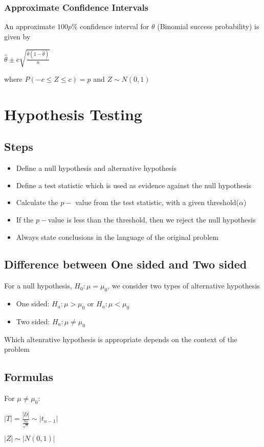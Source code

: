 \documentclass[12pt]{report}
\begin{document}
    \subsection{Approximate Confidence Intervals}
      An approximate $100p\%$ confidence interval for $\theta$ (Binomial success probability) is given by
      \begin{center}$\hat{\theta} \pm c\sqrt{\frac{\hat{\theta} (1 - \hat{\theta})}{n}}$\end{center}
      where $P(-c \leq Z \leq c) = p$ and $Z \sim N(0, 1)$

\chapter{Hypothesis Testing}
  \section{Steps}
    \begin{itemize}
      \item Define a null hypothesis and alternative hypothesis
      \item Define a test statistic which is used as evidence against the null hypothesis
      \item Calculate the $p-$ value from the test statistic, with a given threshold($\alpha$)
      \item If the $p-$value is less than the threshold, then we reject the null hypothesis
      \item Always state conclusions in the language of the original problem
    \end{itemize}

  \section{Difference between One sided and Two sided}
    For a null hypothesis, $H_0: \mu = \mu_0$, we consider two types of alternative hypothesis
    \begin{itemize}
      \item One sided: $H_a : \mu > \mu_0$ or $H_a : \mu < \mu_0$
      \item Two sided: $H_a : \mu \neq \mu_0$
    \end{itemize}
    Which altenrative hypothesis is appropriate depends on the context of the problem

  \section{Formulas}
    For $\mu \neq \mu_0$:
    \begin{center}$ |T| = \frac{|\bar{D}|}{\frac{S_D}{\sqrt{n}}} \sim |t_{n-1}| $\end{center}
    \begin{center}$ |Z| \sim |N(0, 1)| $\end{center}
\end{document}
